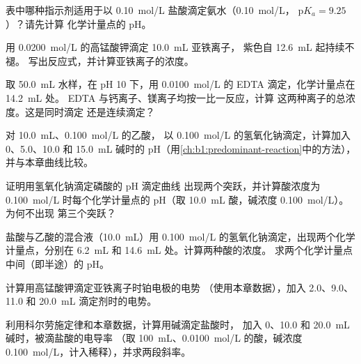 \begin{exercise}[$\star$]\label{exo:b1:titration-methods:2}
表中哪种指示剂适用于以 \qty{0.10}{mol/L} 盐酸滴定氨水（\qty{0.10}{mol/L}，
$\mathrm{p}K_a = 9.25$）？请先计算
化学计量点的 pH。
\end{exercise}

\begin{exercise}[$\star$]\label{exo:b1:titration-methods:3}
用 \qty{0.0200}{mol/L} 的高锰酸钾滴定 \qty{10.0}{mL} 亚铁离子，
紫色自 \qty{12.6}{mL} 起持续不褪。
写出反应式，并计算亚铁离子的浓度。
\end{exercise}

\begin{exercise}[$\star$]\label{exo:b1:titration-methods:4}
取 \qty{50.0}{mL} 水样，在 pH 10 下，用
\qty{0.0100}{mol/L} 的 EDTA 滴定，化学计量点在 \qty{14.2}{mL} 处。
EDTA 与钙离子、镁离子均按一比一反应，计算
这两种离子的总浓度。这是同时滴定
还是连续滴定？
\end{exercise}

\begin{exercise}[$\star\star$]\label{exo:b1:titration-methods:5}
对 \qty{10.0}{mL}、\qty{0.100}{mol/L} 的乙酸，
以 \qty{0.100}{mol/L} 的氢氧化钠滴定，计算加入 0、5.0、10.0
和 \qty{15.0}{mL} 碱时的 pH（用\cref{ch:b1:predominant-reaction}中的方法），
并与本章曲线比较。
\end{exercise}

\begin{exercise}[$\star\star$]\label{exo:b1:titration-methods:6}
证明用氢氧化钠滴定磷酸的 pH 滴定曲线
出现两个突跃，并计算酸浓度为 \qty{0.100}{mol/L} 时每个化学计量点的
pH（取 \qty{10.0}{mL} 酸，碱浓度 \qty{0.100}{mol/L}）。为何不出现
第三个突跃？
\end{exercise}

\begin{exercise}[$\star\star$]\label{exo:b1:titration-methods:7}
盐酸与乙酸的混合液（\qty{10.0}{mL}）用
\qty{0.100}{mol/L} 的氢氧化钠滴定，出现两个化学计量点，分别在
\qty{6.2}{mL} 和 \qty{14.6}{mL} 处。计算两种酸的浓度。
求两个化学计量点中间（即半途）的 pH。
\end{exercise}

\begin{exercise}[$\star\star$]\label{exo:b1:titration-methods:8}
计算用高锰酸钾滴定亚铁离子时铂电极的电势
（使用本章数据），加入 2.0、9.0、11.0 和
\qty{20.0}{mL} 滴定剂时的电势。
\end{exercise}

\begin{exercise}[$\star\star$]\label{exo:b1:titration-methods:9}
利用科尔劳施定律和本章数据，计算用碱滴定盐酸时，
加入 0、10.0 和 \qty{20.0}{mL} 碱时，被滴盐酸的电导率
（取 \qty{100}{mL}、\qty{0.0100}{mol/L} 的酸，碱浓度
\qty{0.100}{mol/L}，计入稀释），并求两段斜率。
\end{exercise}

